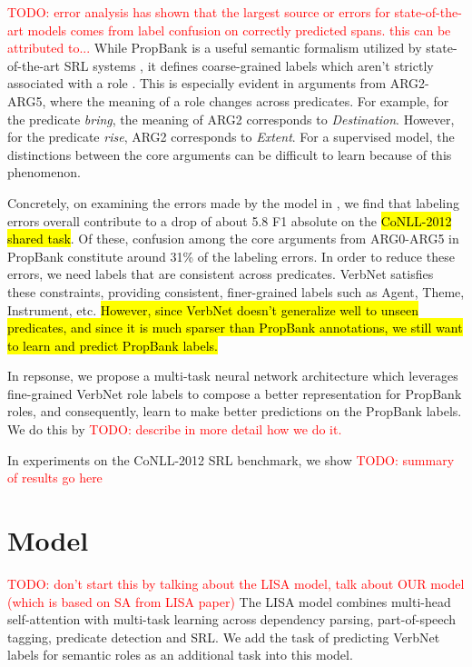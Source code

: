 \documentclass[11pt,a4paper]{article}
\newcommand{\todo}[1]{{\sethlcolor{green}\hl{#1}}}
\newcommand{\rephrase}[1]{{\sethlcolor{cyan}\hl{#1}}}
\newcommand{\emmatodo}[1]{\textcolor{red}{TODO: #1}}
\begin{document}
\emmatodo{error analysis has shown that the largest source or errors for state-of-the-art models comes from label confusion on correctly predicted spans. this can be attributed to... } While PropBank is a useful semantic formalism utilized by state-of-the-art SRL systems \cite{strubell2018linguistically}, it defines coarse-grained labels which aren't strictly associated with a role \cite{loper2007combining}.  This is especially evident in arguments from ARG2-ARG5, where the meaning of a role changes across predicates. For example, for the predicate \textit{bring}, the meaning of ARG2 corresponds to \textit{Destination}. However, for the predicate \textit{rise}, ARG2 corresponds to \textit{Extent}. For a supervised model, the distinctions between the core arguments can be difficult to learn because of this phenomenon.

Concretely, on examining the errors made by the model in \cite{strubell2018linguistically}, we find that labeling errors overall contribute to a drop of about 5.8 F1 absolute on the \rephrase{CoNLL-2012 shared task}. Of these, confusion among the core arguments from ARG0-ARG5 in PropBank constitute around 31\% of the labeling errors. In order to reduce these errors, we need labels that are consistent across predicates. VerbNet \cite{schuler2005verbnet} satisfies these constraints, providing consistent, finer-grained labels such as Agent, Theme, Instrument, etc. \todo{However, since VerbNet doesn't generalize well to unseen predicates, and since it is much sparser than PropBank annotations, we still want to learn and predict PropBank labels.}

In repsonse, we propose a multi-task neural network architecture which leverages fine-grained VerbNet role labels to compose a better representation for PropBank roles, and consequently, learn to make better predictions on the PropBank labels.
We do this by \emmatodo{describe in more detail how we do it.}

In experiments on the CoNLL-2012 SRL benchmark, we show \emmatodo{summary of results go here}

\section{Model}
\emmatodo{don't start this by talking about the LISA model, talk about OUR model (which is based on SA from LISA paper)}
The LISA model \cite{strubell2018linguistically} combines multi-head self-attention with multi-task learning across dependency parsing, part-of-speech tagging, predicate detection and SRL. We add the task of predicting VerbNet labels for semantic roles as an additional task into this model.
\end{document}
